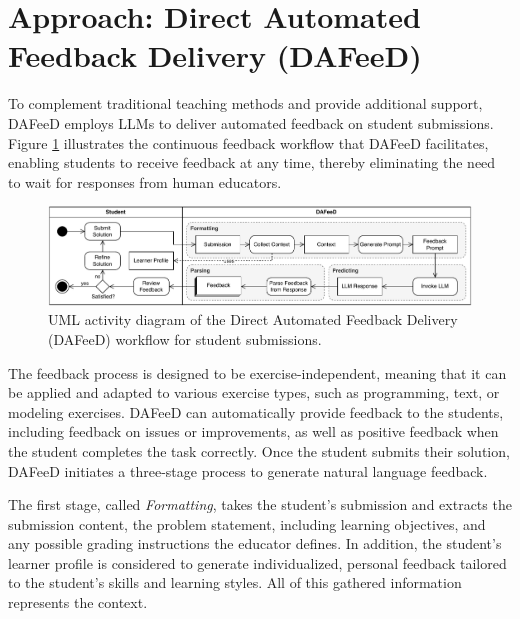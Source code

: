 \documentclass[sigconf,screen,review,anonymous]{acmart}
\begin{document}


\section{Approach: Direct Automated Feedback Delivery (DAFeeD)} %
\label{sec:approach:DAFeeD}

To complement traditional teaching methods and provide additional support, DAFeeD employs LLMs to deliver automated feedback on student submissions.
Figure \ref{fig:DAFeeD-workflow} illustrates the continuous feedback workflow that DAFeeD facilitates, enabling students to receive feedback at any time, thereby eliminating the need to wait for responses from human educators.

\begin{figure}[htbp]
  \centering
  \includegraphics[width=\linewidth]{figures/DAFeeD-ActivityDiagram_alternative.pdf}
  \vspace{-6mm}
  \caption{UML activity diagram of the Direct Automated Feedback Delivery (DAFeeD) workflow for student submissions.}
  \label{fig:DAFeeD-workflow}
  \vspace{-3mm}
\end{figure}

The feedback process is designed to be exercise-independent, meaning that it can be applied and adapted to various exercise types, such as programming, text, or modeling exercises.
DAFeeD can automatically provide feedback to the students, including feedback on issues or improvements, as well as positive feedback when the student completes the task correctly.
Once the student submits their solution, DAFeeD initiates a three-stage process to generate natural language feedback.

The first stage, called \textit{Formatting}, takes the student's submission and extracts the submission content, the problem statement, including learning objectives, and any possible grading instructions the educator defines.
In addition, the student's learner profile \cite{alexander:1998:ProfilingDifferencesStudents} is considered to generate individualized, personal feedback tailored to the student's skills and learning styles.
All of this gathered information represents the context.
\end{document}
